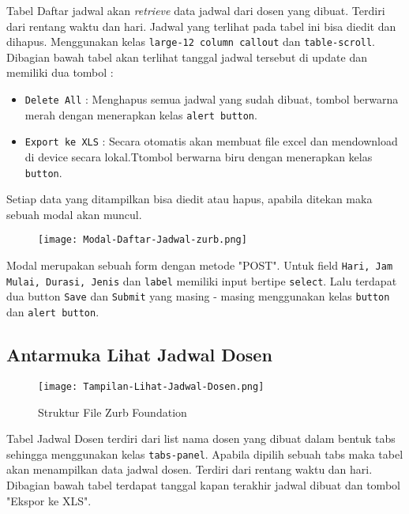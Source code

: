 Tabel Daftar jadwal akan \textit{retrieve} data jadwal dari dosen yang dibuat. Terdiri dari rentang waktu dan hari. Jadwal yang terlihat pada tabel ini bisa diedit dan dihapus. Menggunakan kelas \texttt{large-12 column callout} dan \texttt{table-scroll}.
Dibagian bawah tabel akan terlihat tanggal jadwal tersebut di update dan memiliki dua tombol :
\begin{itemize}
	\item \texttt{Delete All} : Menghapus semua jadwal yang sudah dibuat, tombol berwarna merah dengan menerapkan kelas \texttt{alert button}.
	\item \texttt{Export ke XLS} : Secara otomatis akan membuat file excel dan mendownload di device secara lokal.Ttombol berwarna biru dengan menerapkan kelas \texttt{button}.
\end{itemize}
Setiap data yang ditampilkan bisa diedit atau hapus, apabila ditekan maka sebuah modal akan muncul.  
\begin{figure} [H]
	\centering  
	\texttt{[image: Modal-Daftar-Jadwal-zurb.png]}  
	\caption{} 	
\end{figure}
Modal merupakan sebuah form dengan metode "POST". Untuk field \texttt{Hari, Jam Mulai, Durasi, Jenis} dan \texttt{label} memiliki input bertipe \texttt{select}. Lalu terdapat dua button \texttt{Save} dan \texttt{Submit} yang masing - masing menggunakan kelas \texttt{button} dan \texttt{alert button}.

\subsection{Antarmuka Lihat Jadwal Dosen}
\begin{figure} [H]
	\centering  
	\texttt{[image: Tampilan-Lihat-Jadwal-Dosen.png]}  
	\caption{Struktur File Zurb Foundation} 	
\end{figure}
Tabel Jadwal Dosen terdiri dari list nama dosen yang dibuat dalam bentuk tabs sehingga menggunakan kelas \texttt{tabs-panel}. Apabila dipilih sebuah tabs maka tabel akan menampilkan data jadwal dosen.  Terdiri dari rentang waktu dan hari. Dibagian bawah tabel terdapat tanggal kapan terakhir jadwal dibuat dan tombol "Ekspor ke XLS".
